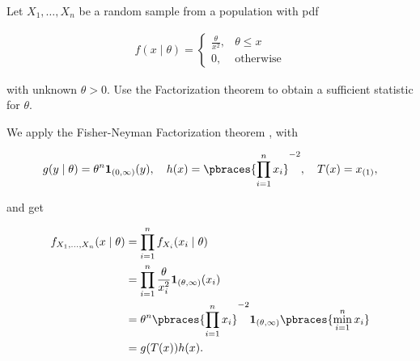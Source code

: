 
\begin{exercise}

Let $X_1, \dots, X_n$ be a random sample from a population with pdf

\begin{align*}
    f(x \mid \theta)
    =
    \begin{cases}
        \frac{\theta}{x^2}, & \theta \leq x \\
        0,                  & \text{otherwise}
    \end{cases}
\end{align*}

with unknown $\theta > 0$.
Use the Factorization theorem to obtain a sufficient statistic for $\theta$.

\end{exercise}


\begin{solution}

We apply the Fisher-Neyman Factorization theorem \cite[lecture 8, slide 13]{EStat}, with

\begin{align*}
    g(y \mid \theta) = \theta^n \mathbf 1_{(0, \infty)}(y),
    \quad
    h(x) = \pbraces{\prod_{i=1}^n x_i}^{-2},
    \quad
    T(x) = x_{(1)},
\end{align*}

and get

\begin{align*}
    f_{X_1, \dots, X_n}(x \mid \theta)
    & =
    \prod_{i=1}^n f_{X_i}(x_i \mid \theta) \\
    & =
    \prod_{i=1}^n \frac{\theta}{x_i^2} \mathbf 1_{(\theta, \infty)}(x_i) \\
    & =
    \theta^n \pbraces{\prod_{i=1}^n x_i}^{-2} \mathbf 1_{(\theta, \infty)} \pbraces{\min_{i=1}^n x_i} \\
    & =
    g(T(x)) h(x).
\end{align*}

\end{solution}

